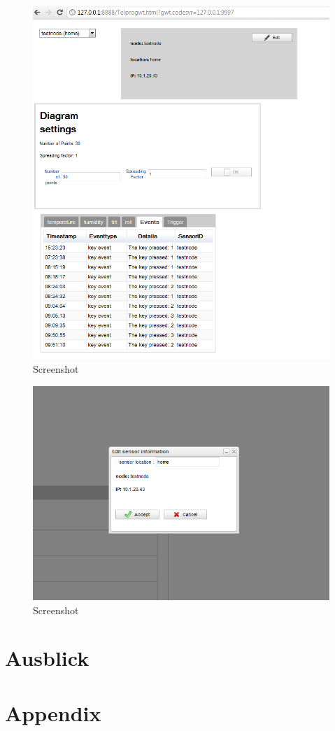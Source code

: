 \documentclass[12pt,a4paper,twoside]{article}
\newcommand{\labelSec}[1]{\label{sec:#1}}
\begin{document}
\begin{figure}[htbp]
   \centering
   \includegraphics[width=12cm]{fig/screen3.png}
   \caption{Screenshot}
   \label{screen3}
\end{figure}

\begin{figure}[htbp]
   \centering
   \includegraphics[width=12cm]{fig/screen4.png}
   \caption{Screenshot}
   \label{screen4}
\end{figure}
  
\section{Ausblick} \labelSec{ausblick}

\clearpage

\section{Appendix}




\end{document}
